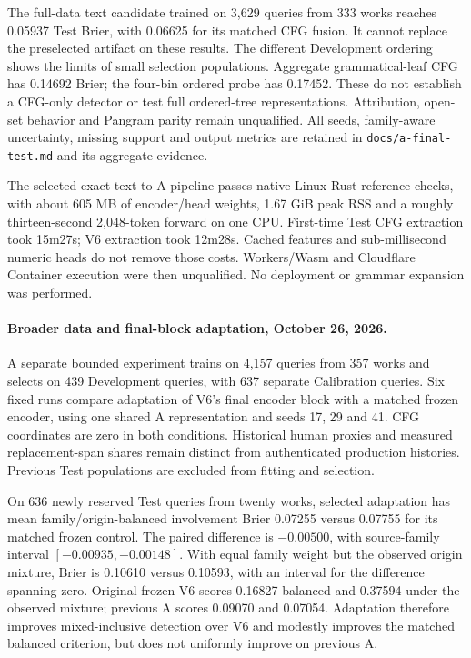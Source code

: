 The full-data text candidate trained on 3,629 queries from 333 works reaches
0.05937 Test Brier, with 0.06625 for its matched CFG fusion. It cannot replace
the preselected artifact on these results. The different Development ordering
shows the limits of small selection populations. Aggregate grammatical-leaf CFG
has 0.14692 Brier; the four-bin ordered probe has 0.17452. These do not establish
a CFG-only detector or test full ordered-tree representations. Attribution,
open-set behavior and Pangram parity remain unqualified. All seeds, family-aware
uncertainty, missing support and output metrics are retained in
\texttt{docs/a-final-test.md} and its aggregate evidence.

The selected exact-text-to-A pipeline passes native Linux Rust reference checks,
with about 605 MB of encoder/head weights, 1.67 GiB peak RSS and a roughly
thirteen-second 2,048-token forward on one CPU. First-time Test CFG extraction
took 15m27s; V6 extraction took 12m28s. Cached features and sub-millisecond
numeric heads do not remove those costs. Workers/Wasm and Cloudflare Container
execution were then unqualified. No deployment or grammar expansion was performed.

\paragraph{Broader data and final-block adaptation, October 26, 2026.}
A separate bounded experiment trains on 4,157 queries from 357 works and selects
on 439 Development queries, with 637 separate Calibration queries. Six fixed
runs compare adaptation of V6's final encoder block with a matched frozen
encoder, using one shared A representation and seeds 17, 29 and 41. CFG
coordinates are zero in both conditions. Historical human proxies and measured
replacement-span shares remain distinct from authenticated production histories.
Previous Test populations are excluded from fitting and selection.

On 636 newly reserved Test queries from twenty works, selected adaptation has
mean family/origin-balanced involvement Brier 0.07255 versus 0.07755 for its
matched frozen control. The paired difference is $-0.00500$, with source-family
interval $[-0.00935,-0.00148]$. With equal family weight but the observed origin
mixture, Brier is 0.10610 versus 0.10593, with an interval for the difference
spanning zero. Original frozen V6 scores 0.16827 balanced and 0.37594 under the
observed mixture; previous A scores 0.09070 and 0.07054. Adaptation therefore
improves mixed-inclusive detection over V6 and modestly improves the matched
balanced criterion, but does not uniformly improve on previous A.

